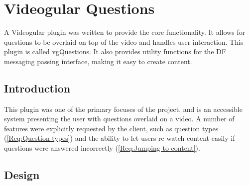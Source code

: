 
\chapter{Videogular Questions} \label{Chapter:VideogularQuestions}

\begin{preamble}
	A \gls{Videogular} plugin was written to provide the core functionality. It allows for questions to be overlaid on top of the video and handles user interaction. This plugin is called \gls{vgQuestions}. It also provides utility functions for the \gls{DF} messaging passing interface, making it easy to create content.
\end{preamble}

\section{Introduction}

This plugin was one of the primary focuses of the project, and is an accessible system presenting the user with questions overlaid on a video. A number of features were explicitly requested by the client, such as question types (\cref{Req:Question types}) and the ability to let users re-watch content easily if questions were answered incorrectly (\cref{Req:Jumping to content}).

\section{Design}

